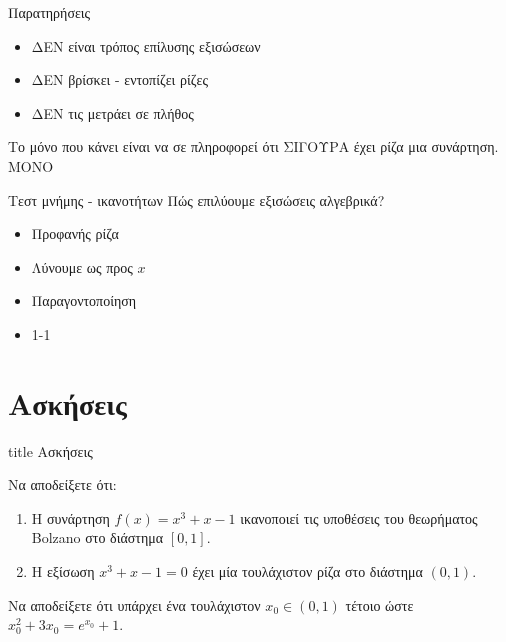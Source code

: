 \documentclass{presentation}
\begin{document}
\begin{frame}{Παρατηρήσεις}
  \begin{itemize}
    \item<1-> ΔΕΝ είναι τρόπος επίλυσης εξισώσεων
    \item<2-> ΔΕΝ βρίσκει - εντοπίζει ρίζες
    \item<3-> ΔΕΝ τις μετράει σε πλήθος
  \end{itemize}
  Το μόνο που κάνει είναι να σε πληροφορεί ότι ΣΙΓΟΥΡΑ έχει ρίζα μια συνάρτηση.  ΜΟΝΟ
\end{frame}

\begin{frame}{Τεστ μνήμης - ικανοτήτων}
  Πώς επιλύουμε εξισώσεις αλγεβρικά?
  \begin{itemize}
    \item<1-> Προφανής ρίζα
    \item<2-> Λύνουμε ως προς $x$
    \item<3-> Παραγοντοποίηση
    \item<4-> 1-1
  \end{itemize}
\end{frame}


\section{Ασκήσεις}

\begin{frame}[noframenumbering]
  \vfill
  \centering
  \begin{beamercolorbox}[sep=8pt,center,shadow=true,rounded=true]{title}
    Ασκήσεις
  \end{beamercolorbox}
  \vfill
\end{frame}

\begin{askisi}
  Να αποδείξετε ότι:
  \begin{enumerate}
    \item<1-> Η συνάρτηση $f(x)=x^3+x-1$ ικανοποιεί τις υποθέσεις του θεωρήματος Bolzano στο διάστημα $[0,1]$.
    \item<2-> Η εξίσωση $x^3+x-1=0$ έχει μία τουλάχιστον ρίζα στο διάστημα $(0,1)$.
  \end{enumerate}

\end{askisi}

\begin{askisi}
  Να αποδείξετε ότι υπάρχει ένα τουλάχιστον $x_0\in (0,1)$ τέτοιο ώστε $x_0^2+3x_0=e^{x_0}+1$.

\end{askisi}
\end{document}
